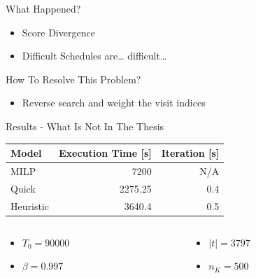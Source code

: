 \documentclass[bigger]{beamer}
\begin{document}
\begin{frame}[label={sec:org99fd9eb}]{What Happened?}
\begin{itemize}
\item Score Divergence
\item Difficult Schedules are\ldots{} difficult\ldots{}
\end{itemize}
\end{frame}
\begin{frame}[label={sec:org0e8233d}]{How To Resolve This Problem?}
\begin{itemize}
\item Reverse search and weight the visit indices
\end{itemize}
\end{frame}
\begin{frame}[label={sec:org62fe417}]{Results - What Is Not In The Thesis}
\begin{center}
\begin{tabular}{lrr}
\alert{Model} & \alert{Execution Time} [s] & \alert{Iteration} [s]\\[0pt]
\hline
MILP & 7200 & N/A\\[0pt]
Quick & 2275.25 & 0.4\\[0pt]
Heuristic & 3640.4 & 0.5\\[0pt]
\end{tabular}
\end{center}

\begin{columns}
\begin{column}{0.5\columnwidth}
\begin{itemize}
\item \(T_0 = 90000\)
\item \(\beta = 0.997\)
\end{itemize}
\end{column}
\begin{column}{0.5\columnwidth}
\begin{itemize}
\item \(|t| = 3797\)
\item \(n_K = 500\)
\end{itemize}
\end{column}
\end{columns}
\end{frame}
\end{document}
